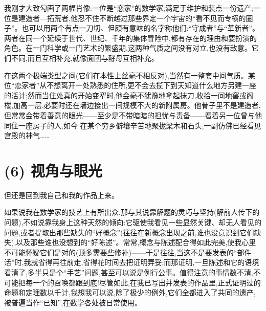 我刚才大致勾画了两幅肖像:一位是“恋家”的数学家,满足于维护和装点一份遗产;一位是建造者—拓荒者,他忍不住不断越过那些界定一个宇宙的“看不见而专横的圈子”。也可以用两个有点一刀切、但颇有意味的名字称他们:“守成者”与“革新者”。两者在同一个延续于世代、世纪、千年的集体冒险中,都有存在的理由和要扮演的角色。在一门科学或一门艺术的繁盛期,这两种气质之间没有对立,也没有敌意。它们不同,而且互相补充,就像面团与酵母互相补充。

在这两个极端类型之间(它们在本性上丝毫不相反对),当然有一整套中间气质。某位“恋家者”从不想离开一处熟悉的住所,更不会去揽下到天知道什么地方另建一座的活计;然而当住处真的开始变窄时,他会毫不犹豫地拿起抹刀,收拾一间地窖或阁楼,加高一层,必要时还在墙边接出一间规模不大的新附属房。他骨子里不是建造者,但常常会带着善意的眼光——至少是不带暗暗的担忧与责备——看着另一位曾与他同住一座房子的人,如今
在某个穷乡僻壤辛苦地聚拢梁木和石头,一副仿佛已经看见宫殿的神气……

\section{(6) 视角与眼光}

但还是回到我自己和我的作品上来。

如果说我在数学家的技艺上有所出众,那与其说靠解题的灵巧与坚持(解前人传下的问题),不如说靠我身上这种天然的倾向:它驱使我看见一些显然关键、却无人看见的问题,或者提取出那些缺失的“好概念”(往往在新概念出现之前,谁也没意识到它们缺失),以及那些谁也没想到的“好陈述”。常常,概念与陈述配合得如此完美,使我心里不可能怀疑它们是对的(顶多需要些修补)——于是往往,当这不是要发表的“部件活”时,我就省得再往前走,省得花时间去把证明弄妥;而那证明,一旦陈述和它的语境看清了,多半只是个“手艺”问题,甚至可以说是例行公事。值得注意的事情数不清,不可能把每一个的召唤都跟到底!尽管如此,在我已写出并发表的作品里,正式证明过的命题和定理数以千计,我想我可以说,除了极少的例外,它们全都进入了共同的遗产,被普遍当作“已知”,在数学各处被日常使用。

